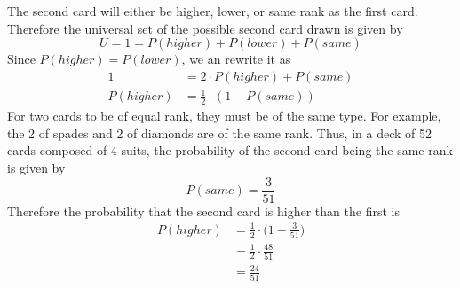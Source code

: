 \documentclass[11pt, oneside]{article}   	%
\begin{document}
The second card will either be higher, lower, or same rank as the first card. Therefore the universal set of the possible second card drawn is given by
$$U = 1 = P(higher) + P(lower) + P(same)$$
Since $P(higher) = P(lower)$, we an rewrite it as
\begin{align*}
1 & = 2 \cdot P(higher) + P(same) \\
P(higher) & = \frac{1}{2} \cdot (1-P(same))
\end{align*}
For two cards to be of equal rank, they must be of the same type. For example, the 2 of spades and 2 of diamonds are of the same rank. Thus, in a deck of 52 cards composed of 4 suits, the probability of the second card being the same rank is given by
$$P(same) = \frac{3}{51}$$
Therefore the probability that the second card is higher than the first is
\begin{align*}
P(higher) & = \frac{1}{2} \cdot \Big(1- \frac{3}{51}\Big) \\
& = \frac{1}{2} \cdot \frac{48}{51} \\
& = \frac{24}{51}
\end{align*}
\end{document}
